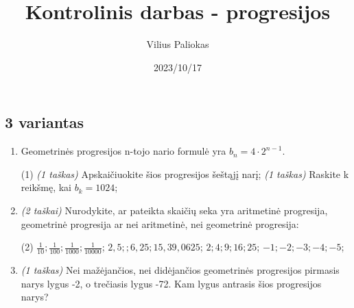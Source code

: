 \documentclass[a4paper]{article}
\title{Kontrolinis darbas - progresijos}
\author{Vilius Paliokas}
\date{2023/10/17}
\begin{document}
\thispagestyle{fancy}

\titlespacing*{\subsection}{0pt}{.75ex}{0.75ex}

\subsection*{3 variantas}

\begin{enumerate}
      \item Geometrinės progresijos n-tojo nario formulė yra $b_{n}=4 \cdot
                  2^{n-1}$.

            \begin{tasks}[item-format={\normalfont}, after-item-skip=2mm](1)
                  \task \textit{(1 taškas)} Apskaičiuokite šios progresijos
                  šeštąjį narį;
                  \task \textit{(1 taškas)} Raskite k reikšmę, kai $b_k=1024$;
            \end{tasks}

      \item \textit{(2 taškai)} Nurodykite, ar pateikta skaičių seka yra
            aritmetinė progresija, geometrinė progresija ar nei aritmetinė, nei
            geometrinė progresija:
            \begin{tasks}[item-format={\normalfont}, after-item-skip=2mm](2)
                  \task $\frac{1}{10}; \frac{1}{100}; \frac{1}{1000};
                        \frac{1}{10000}$;
                  \task $2,5;;6,25;15,39,0625$;
                  \task $2; 4; 9; 16; 25$;
                  \task $-1;-2;-3;-4;-5$;
            \end{tasks}

      \item \textit{(1 taškas)} Nei mažėjančios, nei didėjančios geometrinės
            progresijos pirmasis
            narys lygus -2, o trečiasis lygus -72. Kam lygus antrasis šios
            progresijos narys?


\end{enumerate}
\end{document}

